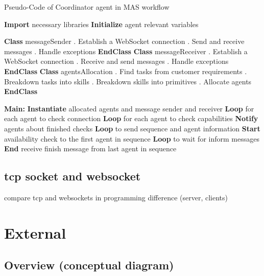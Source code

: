 \begin{algorithm}
\caption{Pseudo-Code of Coordinator agent in MAS workflow}
\label{alg:CDAPseudoCode}
\begin{algorithmic}
\State \textbf{Import} necessary libraries
\State \textbf{Initialize} agent relevant variables

\State \textbf{Class} messageSender
    . Establish a WebSocket connection
    . Send and receive messages
    . Handle exceptions
    \EndProcedure
\State \textbf{EndClass}
\State \textbf{Class} messageReceiver
    . Establish a WebSocket connection
    . Receive and send messages
    . Handle exceptions
    \EndProcedure
\State \textbf{EndClass}
\State \textbf{Class} agentsAllocation
    . Find tasks from customer requirements
    . Breakdown tasks into skills
    . Breakdown skills into primitives
    . Allocate agents
    \EndProcedure
\State \textbf{EndClass}

\State \textbf{Main:}
\State \textbf{Instantiate} allocated agents and message sender and receiver
\State \textbf{Loop} for each agent to check connection
\State \textbf{Loop} for each agent to check capabilities
\State \textbf{Notify} agents about finished checks
\State \textbf{Loop} to send sequence and agent information
\State \textbf{Start} availability check to the first agent in sequence
\State \textbf{Loop} to wait for inform messages
\State \textbf{End} receive finish message from last agent in sequence 
\end{algorithmic}
\end{algorithm}

\subsection{tcp socket and websocket}
compare tcp and websockets in programming difference (server, clients)


\section{External}
\subsection{Overview (conceptual diagram)}

